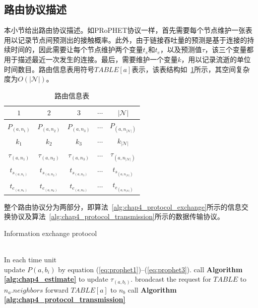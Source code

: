 \subsection{路由协议描述}
本小节给出路由协议描述。如PRoPHET协议一样，首先需要每个节点维护一张表用以记录节点间预测出的接触概率。此外，由于链接吞吐量的预测是基于连接的持续时间的，因此需要让每个节点维护两个变量$t_s$和$t_e$，以及预测值$\tau$，该三个变量都用于描述最近一次发生的连接。最后，需要维护一个变量$k$，用以记录流逝的单位时间数目。路由信息表用符号$TABLE[a]$表示，该表结构如\tablename~\ref{tab:chap4_records}所示，其空间复杂度为$O(|\mathcal{N}|)$。

\begin{table}
\centering
  \caption{路由信息表}
  \label{tab:chap4_records}
  \begin{tabular}{ccccc}
  \hline
    $1$  & $2$ & $3$ & $\cdots$ & $|\mathcal{N}|$  \\
    \hline
    $P_{(a,n_1)}$ & $P_{(a,n_2)}$ & $P_{(a,n_3)}$ & $\cdots$ & $P_{(a,n_{|\mathcal{N}|})}$  \\
    $k_1$ & $k_2$ & $k_3$ & $\cdots$ & $k_{|\mathcal{N}|}$   \\
    $\tau_{(a,n_1)}$ & $\tau_{(a,n_2)}$ & $\tau_{(a,n_3)}$ & $\cdots$ & $\tau_{(a,n_{|\mathcal{N}|})}$  \\
    $t_{s_{(a,n_1)}}$ & $t_{s_{(a,n_2)}}$ & $t_{s_{(a,n_3)}}$  & $\cdots$  & $t_{s_{(a,n_{|\mathcal{N}|})}}$     \\
    $t_{e_{(a,n_1)}}$ & $t_{e_{(a,n_2)}}$  & $t_{e_{(a,n_3)}}$ & $\cdots$ & $t_{e_{(a,n_{|\mathcal{N}|})}}$  \\
    \hline
  \end{tabular}
\end{table}

整个路由协议分为两部分，即算法~\ref{alg:chap4_protocol_exchange}所示的信息交换协议及算法~\ref{alg:chap4_protocol_transmission}所示的数据传输协议。

\begin{algorithm}[!tbp] %
\renewcommand\algorithmicrequire{\textbf{Triggering Condition:}}
\renewcommand\algorithmicensure {\textbf{$\mathbf{n_a}$ Executes:} }
\caption{Information exchange protocol} %
\label{alg:chap4_protocol_exchange} %
\begin{algorithmic}[1] %
\REQUIRE ~~\\ %
In each time unit
\ENSURE ~~\\ %
    \STATE update $P(a,b_i)$ by equation (\ref{eq:prophet1})--(\ref{eq:prophet3}).
    \STATE call \textbf{Algorithm \ref{alg:chap4_estimate}} to update $\tau_{(a,b_i)}$.
\ENDFOR
\STATE broadcast the request for $TABLE$ to $n_a.neighbors$
    \STATE forward $TABLE[a]$ to $n_b$
\ENDIF
{}
    \STATE call \textbf{Algorithm \ref{alg:chap4_protocol_transmission}}
\ENDIF
\end{algorithmic}
\end{algorithm}

